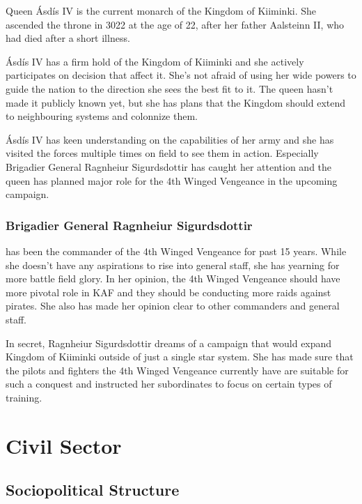 \documentclass{tufte-book}
\begin{document}
 Queen \'{A}sd\'{i}s IV is the current monarch
of the Kingdom of Kiiminki. She ascended the throne in 3022 at the age of 22,
after her father A\dh alsteinn II, who had died after a short illness.

\'{A}sd\'{i}s IV has a firm hold of the Kingdom of Kiiminki and she actively
participates on decision that affect it. She's not afraid of using her wide
powers to guide the nation to the direction she sees the best fit to it. The
queen hasn't made it publicly known yet, but she has plans that the Kingdom
should extend to neighbouring systems and colonnize them.

\'{A}sd\'{i}s IV has keen understanding on the capabilities of her army and
she has visited the forces multiple times on field to see them in action.
Especially Brigadier General Ragnhei\dh ur Sigurdsdottir has caught her
attention and the queen has planned major role for the 4th Winged Vengeance
in the upcoming campaign.

\subsection{Brigadier General Ragnhei\dh ur Sigurdsdottir}
\label{sc:bio-ragnheidur sigurdsdottir}

 has been the commander of the 4th
Winged Vengeance for past 15 years. While she doesn't have any aspirations to
rise into general staff, she has yearning for more battle field glory. In her
opinion, the 4th Winged Vengeance should have more pivotal role in KAF and
they should be conducting more raids against pirates. She also has made her
opinion clear to other commanders and general staff.

In secret, Ragnhei\dh ur Sigurdsdottir dreams of a campaign that would expand
Kingdom of Kiiminki outside of just a single star system. She has made sure
that the pilots and fighters the 4th Winged Vengeance currently have are
suitable for such a conquest and instructed her subordinates to focus on
certain types of training.

\chapter{Civil Sector}
\label{ch:civil-sector}

\section{Sociopolitical Structure}
\label{sc:sociopolitical-structure}
\end{document}
